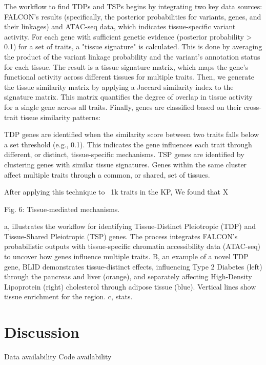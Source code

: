The workflow to find TDPs and TSPs begins by integrating two key data sources: FALCON's results (specifically, the posterior probabilities for variants, genes, and their linkages) and ATAC-seq data, which indicates tissue-specific variant activity. For each gene with sufficient genetic evidence (posterior probability > 0.1) for a set of traits, a "tissue signature" is calculated. This is done by averaging the product of the variant linkage probability and the variant's annotation status for each tissue. The result is a tissue signature matrix, which maps the gene's functional activity across different tissues for multiple traits. Then, we generate the tissue similarity matrix by applying a Jaccard similarity index to the signature matrix. This matrix quantifies the degree of overlap in tissue activity for a single gene across all traits. Finally, genes are classified based on their cross-trait tissue similarity patterns:

TDP genes are identified when the similarity score between two traits falls below a set threshold (e.g., 0.1). This indicates the gene influences each trait through different, or distinct, tissue-specific mechanisms. TSP genes are identified by clustering genes with similar tissue signatures. Genes within the same cluster affect multiple traits through a common, or shared, set of tissues.

After applying this technique to ~1k traits in the KP, We found that X%





Fig. 6: Tissue-mediated mechanisms.

a, illustrates the workflow for identifying Tissue-Distinct Pleiotropic (TDP) and Tissue-Shared Pleiotropic (TSP) genes. The process integrates FALCON's probabilistic outputs with tissue-specific chromatin accessibility data (ATAC-seq) to uncover how genes influence multiple traits. B, an example of a novel TDP gene, BLID demonstrates tissue-distinct effects, influencing Type 2 Diabetes (left) through the pancreas and liver (orange), and separately affecting High-Density Lipoprotein (right) cholesterol through adipose tissue (blue). Vertical lines show tissue enrichment for the region. c, stats.
\section{Discussion}
\label{sec:discussion}
Data availability Code availability
